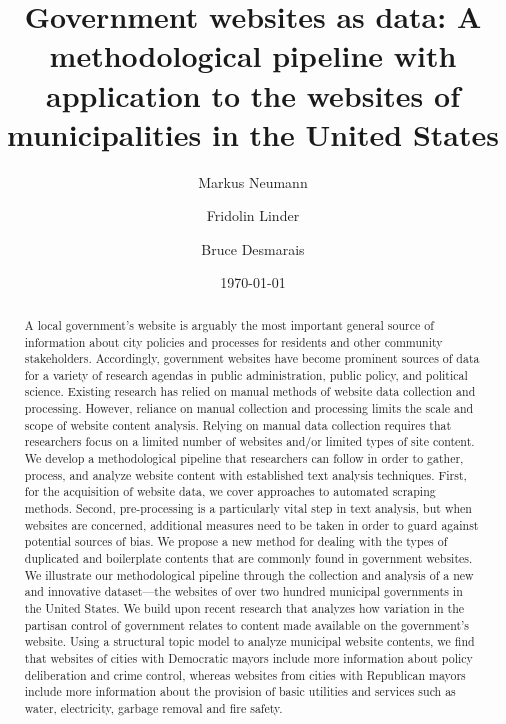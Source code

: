 \documentclass[11pt]{article}
\title{\vspace{-2cm} Government websites as data: A methodological pipeline with application to the websites of municipalities in the United States}
\author{ Markus Neumann \and Fridolin Linder \and Bruce Desmarais} \date{\today}
\begin{document}
\maketitle




\begin{abstract}

A local government's website is arguably the most important general source of information about city policies and processes for residents and other community stakeholders. Accordingly, government websites have become prominent sources of data for a variety of research agendas in public administration, public policy, and political science. Existing research has relied on manual methods of website data collection and processing. However, reliance on manual collection and processing limits the scale and scope of website content analysis. Relying on manual data collection requires that researchers focus on a limited number of websites and/or limited types of site content.  We develop a methodological pipeline that researchers can follow in order to gather, process, and analyze website content with established text analysis techniques. First, for the acquisition of website data, we cover approaches to automated scraping methods. Second, pre-processing is a particularly vital step in text analysis, but when websites are concerned, additional measures need to be taken in order to guard against potential sources of bias. We propose a new method for dealing with the types of duplicated and boilerplate contents that are commonly found in government websites. We illustrate our methodological pipeline through the collection and analysis of a new and innovative dataset---the websites of over two hundred municipal governments in the United States. We build upon recent research that analyzes how variation in the partisan control of government relates to content made available on the government's website. Using a structural topic model to analyze municipal website contents, we find that websites of cities with Democratic mayors include more information about policy deliberation and crime control, whereas websites from cities with Republican mayors include more information about the provision of basic utilities and services such as water, electricity, garbage removal and fire safety.

\end{abstract}
\end{document}
